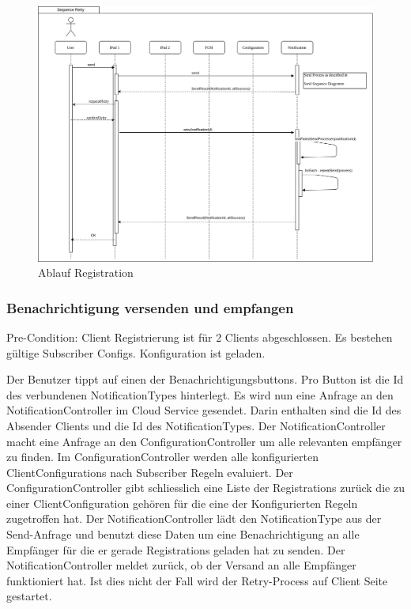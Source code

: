 \begin{figure}[h]
    \centering
    \begin{minipage}[b]{0.9\textwidth}
        \includegraphics[width=\textwidth]{graphics/Sequence_Notification_Register}
        \caption{Ablauf Registration}
    \end{minipage}
\end{figure}


\subsubsection*{Benachrichtigung versenden und empfangen}

Pre-Condition: Client Registrierung ist für 2 Clients abgeschlossen. Es bestehen gültige Subscriber Configs. Konfiguration ist geladen.

Der Benutzer tippt auf einen der Benachrichtigungsbuttons.
Pro Button ist die Id des verbundenen NotificationTypes hinterlegt.
Es wird nun eine Anfrage an den NotificationController im Cloud Service gesendet.
Darin enthalten sind die Id des Absender Clients und die Id des NotificationTypes.
Der NotificationController macht eine Anfrage an den ConfigurationController um alle relevanten empfänger zu finden.
Im ConfigurationController werden alle konfigurierten ClientConfigurations nach Subscriber Regeln evaluiert.
Der ConfigurationController gibt schliesslich eine Liste der Registrations zurück die zu einer ClientConfiguration gehören für die eine der Konfigurierten Regeln zugetroffen hat.
Der NotificationController lädt den NotificationType aus der Send-Anfrage und benutzt diese Daten um eine Benachrichtigung an alle Empfänger für die er gerade Registrations geladen hat zu senden.
Der NotificationController meldet zurück, ob der Versand an alle Empfänger funktioniert hat.
Ist dies nicht der Fall wird der Retry-Process auf Client Seite gestartet.

